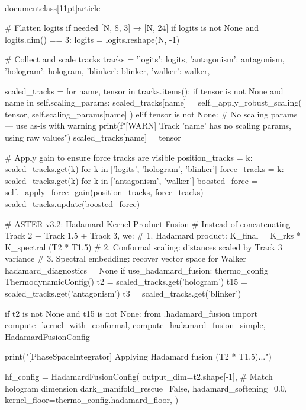 \\documentclass[11pt]{article}
\begin{document}
\begin{CodeBlock}
        # Flatten logits if needed [N, 8, 3] → [N, 24]
        if logits is not None and logits.dim() == 3:
            logits = logits.reshape(N, -1)

        # Collect and scale tracks
        tracks = {
            'logits': logits,
            'antagonism': antagonism,
            'hologram': hologram,
            'blinker': blinker,
            'walker': walker,
        }

        scaled_tracks = {}
        for name, tensor in tracks.items():
            if tensor is not None and name in self.scaling_params:
                scaled_tracks[name] = self._apply_robust_scaling(
                    tensor, self.scaling_params[name]
                )
            elif tensor is not None:
                # No scaling params — use as-is with warning
                print(f"[WARN] Track '{name}' has no scaling params, using raw values")
                scaled_tracks[name] = tensor

        # Apply gain to ensure force tracks are visible
        position_tracks = {k: scaled_tracks.get(k) for k in ['logits', 'hologram', 'blinker']}
        force_tracks = {k: scaled_tracks.get(k) for k in ['antagonism', 'walker']}
        boosted_force = self._apply_force_gain(position_tracks, force_tracks)
        scaled_tracks.update(boosted_force)

        # ASTER v3.2: Hadamard Kernel Product Fusion
        # Instead of concatenating Track 2 + Track 1.5 + Track 3, we:
        #   1. Hadamard product: K_final = K_rks * K_spectral (T2 * T1.5)
        #   2. Conformal scaling: distances scaled by Track 3 variance
        #   3. Spectral embedding: recover vector space for Walker
        hadamard_diagnostics = None
        if use_hadamard_fusion:
            thermo_config = ThermodynamicConfig()
            t2 = scaled_tracks.get('hologram')
            t15 = scaled_tracks.get('antagonism')
            t3 = scaled_tracks.get('blinker')

            if t2 is not None and t15 is not None:
                from .hadamard_fusion import compute_kernel_with_conformal, compute_hadamard_fusion_simple, HadamardFusionConfig

                print("[PhaseSpaceIntegrator] Applying Hadamard fusion (T2 * T1.5)...")

                hf_config = HadamardFusionConfig(
                    output_dim=t2.shape[-1],  # Match hologram dimension
                    dark_manifold_rescue=False,
                    hadamard_softening=0.0,
                    kernel_floor=thermo_config.hadamard_floor,
                )


\end{CodeBlock}
\end{document}
